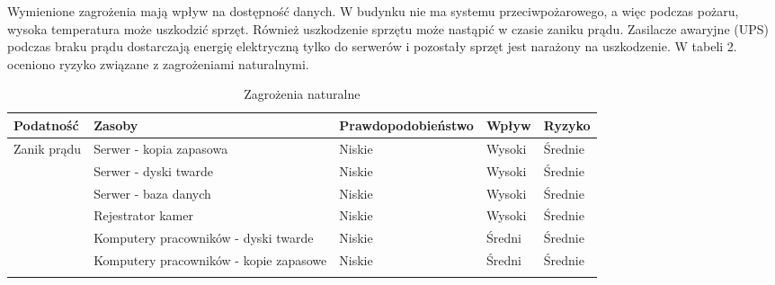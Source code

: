 Wymienione zagrożenia mają wpływ na dostępność danych. W budynku nie ma systemu przeciwpożarowego, a więc podczas pożaru, wysoka temperatura może uszkodzić sprzęt. Również uszkodzenie sprzętu może nastąpić w czasie zaniku prądu. Zasilacze awaryjne (UPS) podczas braku prądu dostarczają energię elektryczną tylko do serwerów i pozostały sprzęt jest narażony na uszkodzenie. W tabeli 2. oceniono ryzyko związane z zagrożeniami naturalnymi.
\begin{landscape}[ht!]
	\begin{longtable}{|m{4cm}|m{6cm}|m{4.5cm}|m{3cm}|m{3cm}|}
	\caption{Zagrożenia naturalne}
	\label{tab:zagrozenia_naturalne}\\
		\hline
		\multicolumn{1}{|l|}{\textbf{Podatność}}           & \multicolumn{1}{l|}{\textbf{Zasoby}}                        & \multicolumn{1}{l|}{\textbf{Prawdopodobieństwo}} & \multicolumn{1}{l|}{\textbf{Wpływ}} & \multicolumn{1}{l|}{\textbf{Ryzyko}} \\ \hline
		\multicolumn{1}{|l|}{\multirow{8}{*}{Zanik prądu}} & \multicolumn{1}{l|}{Serwer - kopia zapasowa}                & \multicolumn{1}{l|}{Niskie}                      & \multicolumn{1}{l|}{Wysoki}         & \multicolumn{1}{l|}{Średnie}         \\ \cline{2-5} 
		\multicolumn{1}{|l|}{}                             & \multicolumn{1}{l|}{Serwer - dyski twarde}                  & \multicolumn{1}{l|}{Niskie}                      & \multicolumn{1}{l|}{Wysoki}         & \multicolumn{1}{l|}{Średnie}         \\ \cline{2-5} 
		\multicolumn{1}{|l|}{}                             & \multicolumn{1}{l|}{Serwer - baza danych}                   & \multicolumn{1}{l|}{Niskie}                      & \multicolumn{1}{l|}{Wysoki}         & \multicolumn{1}{l|}{Średnie}         \\ \cline{2-5} 
		\multicolumn{1}{|l|}{}                             & \multicolumn{1}{l|}{Rejestrator kamer}                      & \multicolumn{1}{l|}{Niskie}                      & \multicolumn{1}{l|}{Wysoki}         & \multicolumn{1}{l|}{Średnie}         \\ \cline{2-5} 
		\multicolumn{1}{|l|}{}                             & \multicolumn{1}{l|}{Komputery pracowników - dyski twarde}   & \multicolumn{1}{l|}{Niskie}                      & \multicolumn{1}{l|}{Średni}         & \multicolumn{1}{l|}{Średnie}         \\ \cline{2-5} 
		\multicolumn{1}{|l|}{}                             & \multicolumn{1}{l|}{Komputery pracowników - kopie zapasowe} & \multicolumn{1}{l|}{Niskie}                      & \multicolumn{1}{l|}{Średni}         & \multicolumn{1}{l|}{Średnie}         \\ \cline{2-5} 

\end{longtable}
\end{landscape}

